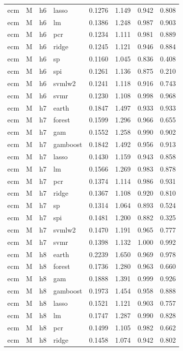 \begin{ThreePartTable}
\begin{longtable}[t]{llclcccc}
ecm & M & h6 & lasso & 0.1276 & 1.149 & 0.942 & 0.808\\
ecm & M & h6 & lm & 0.1386 & 1.248 & 0.987 & 0.903\\
ecm & M & h6 & pcr & 0.1234 & 1.111 & 0.981 & 0.889\\
ecm & M & h6 & ridge & 0.1245 & 1.121 & 0.946 & 0.884\\
ecm & M & h6 & sp & 0.1160 & 1.045 & 0.836 & 0.408\\
ecm & M & h6 & spi & 0.1261 & 1.136 & 0.875 & 0.210\\
ecm & M & h6 & svmlw2 & 0.1241 & 1.118 & 0.916 & 0.743\\
ecm & M & h6 & svmr & 0.1230 & 1.108 & 0.998 & 0.968\\
\addlinespace
ecm & M & h7 & earth & 0.1847 & 1.497 & 0.933 & 0.933\\
ecm & M & h7 & forest & 0.1599 & 1.296 & 0.966 & 0.655\\
ecm & M & h7 & gam & 0.1552 & 1.258 & 0.990 & 0.902\\
ecm & M & h7 & gamboost & 0.1842 & 1.492 & 0.956 & 0.913\\
ecm & M & h7 & lasso & 0.1430 & 1.159 & 0.943 & 0.858\\
ecm & M & h7 & lm & 0.1566 & 1.269 & 0.983 & 0.878\\
ecm & M & h7 & pcr & 0.1374 & 1.114 & 0.986 & 0.931\\
ecm & M & h7 & ridge & 0.1367 & 1.108 & 0.920 & 0.810\\
ecm & M & h7 & sp & 0.1314 & 1.064 & 0.893 & 0.524\\
ecm & M & h7 & spi & 0.1481 & 1.200 & 0.882 & 0.325\\
ecm & M & h7 & svmlw2 & 0.1470 & 1.191 & 0.965 & 0.777\\
ecm & M & h7 & svmr & 0.1398 & 1.132 & 1.000 & 0.992\\
\addlinespace
ecm & M & h8 & earth & 0.2239 & 1.650 & 0.969 & 0.978\\
ecm & M & h8 & forest & 0.1736 & 1.280 & 0.963 & 0.660\\
ecm & M & h8 & gam & 0.1888 & 1.391 & 0.999 & 0.926\\
ecm & M & h8 & gamboost & 0.1973 & 1.454 & 0.958 & 0.888\\
ecm & M & h8 & lasso & 0.1521 & 1.121 & 0.903 & 0.757\\
ecm & M & h8 & lm & 0.1747 & 1.287 & 0.990 & 0.828\\
ecm & M & h8 & pcr & 0.1499 & 1.105 & 0.982 & 0.662\\
ecm & M & h8 & ridge & 0.1458 & 1.074 & 0.942 & 0.802\\

\end{longtable}
\end{ThreePartTable}
